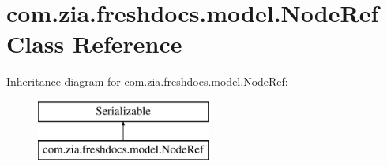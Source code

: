 \hypertarget{classcom_1_1zia_1_1freshdocs_1_1model_1_1_node_ref}{\section{com.\-zia.\-freshdocs.\-model.\-Node\-Ref Class Reference}
\label{classcom_1_1zia_1_1freshdocs_1_1model_1_1_node_ref}
}
Inheritance diagram for com.\-zia.\-freshdocs.\-model.\-Node\-Ref\-:\begin{figure}[H]
\begin{center}
\leavevmode
\includegraphics[height=2.000000cm]{classcom_1_1zia_1_1freshdocs_1_1model_1_1_node_ref}
\end{center}
\end{figure}
